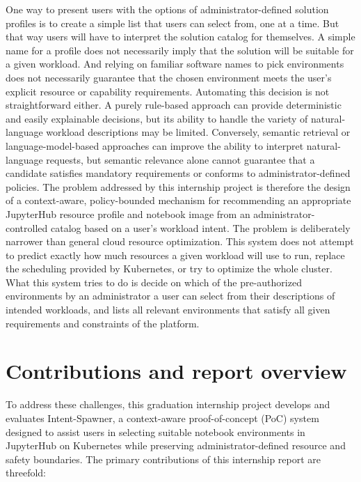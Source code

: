 One way to present users with the options of administrator-defined solution profiles is to create a simple list that users can select from, one at a time. But that way users will have to interpret the solution catalog for themselves. A simple name for a profile does not necessarily imply that the solution will be suitable for a given workload. And relying on familiar software names to pick environments does not necessarily guarantee that the chosen environment meets the user’s explicit resource or capability requirements. Automating this decision is not straightforward either. A purely rule-based approach can provide deterministic and easily explainable decisions, but its ability to handle the variety of natural-language workload descriptions may be limited. Conversely, semantic retrieval or language-model-based approaches can improve the ability to interpret natural-language requests, but semantic relevance alone cannot guarantee that a candidate satisfies mandatory requirements or conforms to administrator-defined policies. The problem addressed by this internship project is therefore the design of a context-aware, policy-bounded mechanism for recommending an appropriate JupyterHub resource profile and notebook image from an administrator-controlled catalog based on a user's workload intent. The problem is deliberately narrower than general cloud resource optimization. This system does not attempt to predict exactly how much resources a given workload will use to run, replace the scheduling provided by Kubernetes, or try to optimize the whole cluster. What this system tries to do is decide on which of the pre-authorized environments by an administrator a user can select from their descriptions of intended workloads, and lists all relevant environments that satisfy all given requirements and constraints of the platform.

\section{Contributions and report overview}

To address these challenges, this graduation internship project develops and evaluates Intent-Spawner, a context-aware proof-of-concept (PoC) system designed to assist users in selecting suitable notebook environments in JupyterHub on Kubernetes while preserving administrator-defined resource and safety boundaries. The primary contributions of this internship report are threefold:


